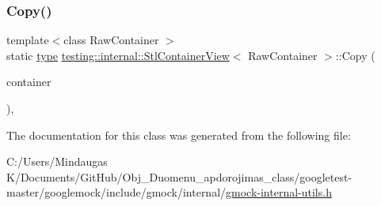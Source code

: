 \mbox{\label{classtesting_1_1internal_1_1_stl_container_view_a441123838221f1284873f66ed968f279}} 
\subsubsection{\texorpdfstring{Copy()}{Copy()}\hspace{0.1cm}{\footnotesize\ttfamily [3/3]}}
{\footnotesize\ttfamily template$<$class Raw\+Container $>$ \\
static \mbox{\hyperlink{classtesting_1_1internal_1_1_stl_container_view_a2b2c63a6dcdbfe63fb0ee121ebf463ba}{type}} \mbox{\hyperlink{classtesting_1_1internal_1_1_stl_container_view}{testing\+::internal\+::\+Stl\+Container\+View}}$<$ Raw\+Container $>$\+::Copy (\begin{DoxyParamCaption}\item[{const Raw\+Container \&}]{container }\end{DoxyParamCaption})\hspace{0.3cm}{\ttfamily [inline]}, {\ttfamily [static]}}



The documentation for this class was generated from the following file\+:\begin{DoxyCompactItemize}
\item 
C\+:/\+Users/\+Mindaugas K/\+Documents/\+Git\+Hub/\+Obj\+\_\+\+Duomenu\+\_\+apdorojimas\+\_\+class/googletest-\/master/googlemock/include/gmock/internal/\mbox{\hyperlink{googletest-master_2googlemock_2include_2gmock_2internal_2gmock-internal-utils_8h}{gmock-\/internal-\/utils.\+h}}\end{DoxyCompactItemize}
